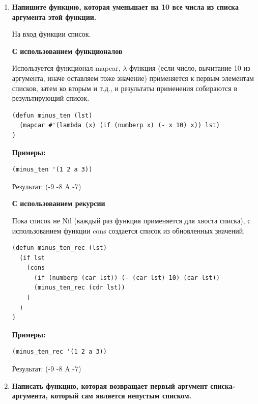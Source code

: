 \documentclass[a4paper,14pt]{extreport} %
\begin{document}
\begin{enumerate}
\textbf{Примеры:}

\begin{lstlisting}
(mul_numbers_rec '(1 2 3) 10)
\end{lstlisting}

Результат: (10 20 30)

\begin{lstlisting}
(mul_all_rec '(1 2 a 3) 10)
\end{lstlisting}

Результат: (10 20 A 30)

\item \textbf{Напишите функцию, которая уменьшает на 10 все числа из списка аргумента этой функции.}

На вход функции список. 

\textbf{С использованием функционалов}

Используется функционал mapcar, $\lambda$-функция (если число, вычитание 10 из аргумента, иначе оставляем тоже значение) применяется к первым элементам списков, затем ко вторым и т.д., и результаты применения собираются в результирующий список.

\begin{lstlisting}
(defun minus_ten (lst)
  (mapcar #'(lambda (x) (if (numberp x) (- x 10) x)) lst)
)
\end{lstlisting}

\textbf{Примеры:}

\begin{lstlisting}
(minus_ten '(1 2 a 3))
\end{lstlisting}

Результат: (-9 -8 A -7)

\textbf{С использованием рекурсии}

Пока список не Nil (каждый раз функция применяется для хвоста списка), с использованием функции cons создается список из обновленных значений. 

\begin{lstlisting}
(defun minus_ten_rec (lst)
  (if lst
    (cons
      (if (numberp (car lst)) (- (car lst) 10) (car lst))
      (minus_ten_rec (cdr lst))
    )
  )
)
\end{lstlisting}

\textbf{Примеры:}

\begin{lstlisting}
(minus_ten_rec '(1 2 a 3))
\end{lstlisting}

Результат: (-9 -8 A -7)

\item \textbf{Написать функцию, которая возвращает первый аргумент списка-аргумента, который сам является непустым списком.}


\end{enumerate}
\end{document}
